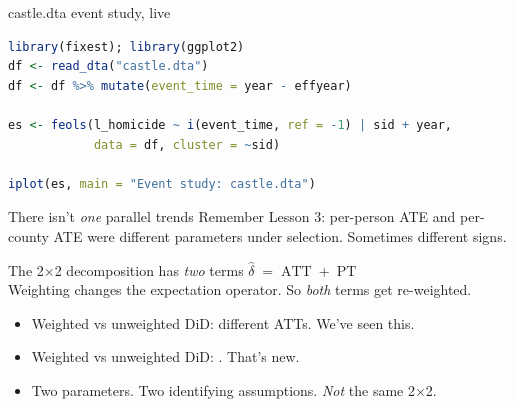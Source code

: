 \documentclass[aspectratio=169,11pt]{beamer}
\begin{document}
\begin{frame}[fragile]{castle.dta event study, live}
\vspace{0.3em}
\begin{lstlisting}[language=R]
library(fixest); library(ggplot2)
df <- read_dta("castle.dta")
df <- df %>% mutate(event_time = year - effyear)

es <- feols(l_homicide ~ i(event_time, ref = -1) | sid + year,
            data = df, cluster = ~sid)

iplot(es, main = "Event study: castle.dta")
\end{lstlisting}
\vspace{0.4em}
\end{frame}

\begin{frame}{There isn't \textit{one} parallel trends}
\vspace{0.4em}
Remember Lesson 3: per-person ATE and per-county ATE were different parameters under selection. Sometimes different signs.
\vspace{0.5em}
\begin{block}{The 2$\times$2 decomposition has \textit{two} terms}
\small
\centering
$\widehat{\delta} \;=\; \text{ATT} \;+\; \text{PT}$ \\[0.3em]
Weighting changes the expectation operator. So \textit{both} terms get re-weighted.
\end{block}
\vspace{0.5em}
\begin{itemize}\small
  \item Weighted vs unweighted DiD: different ATTs. We've seen this.
  \item Weighted vs unweighted DiD: . \;That's new.
  \item Two parameters. Two identifying assumptions. \textit{Not} the same 2$\times$2.
\end{itemize}
\end{frame}
\end{document}
